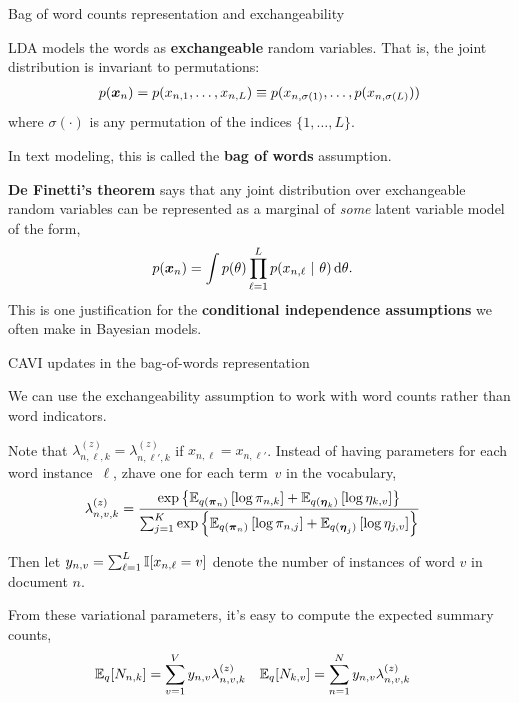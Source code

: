 \documentclass[aspectratio=169]{beamer}
\begin{document}
\begin{frame}{Bag of word counts representation and exchangeability}

LDA models the words as \textbf{exchangeable} random variables. That is, the joint distribution is invariant to permutations:
\begin{align}
    p(\boldsymbol{x}_n) = p(x_{n,1}, \ldots, x_{n,L}) \equiv
    p(x_{n,\sigma(1)}, \ldots, p(x_{n,\sigma(L)})) 
\end{align}
where $\sigma(\cdot)$ is any permutation of the indices $\{1,\ldots,L\}$.

In text modeling, this is called the \textbf{bag of words} assumption.

\textbf{De Finetti's theorem} says that any joint distribution over exchangeable random variables can be represented as a marginal of \textit{some} latent variable model of the form,
\begin{align}
    p(\boldsymbol{x}_n) &= \int p(\theta) \prod_{\ell=1}^L p(x_{n,\ell} ~\vert~ \theta) \mathop{}\!\mathrm{d} \theta.
\end{align}
This is one justification for the \textbf{conditional independence assumptions} we often make in Bayesian models.


\end{frame}

\begin{frame}{CAVI updates in the bag-of-words representation}

We can use the exchangeability assumption to work with word counts rather than word indicators. 

Note that $\lambda_{n,\ell,k}^{(z)} = \lambda_{n,\ell',k}^{(z)}$ if $x_{n,\ell} = x_{n,\ell'}$. Instead of having parameters for each word instance~$\ell$, zhave one for each term~$v$ in the vocabulary,
\begin{align}
\lambda_{n,v,k}^{(z)} &= \frac{\exp\left\{\mathbb{E}_{q(\boldsymbol{\pi}_n)} \left[ \log \pi_{n, k} \right] + \mathbb{E}_{q(\boldsymbol{\eta}_k)} \left[ \log \eta_{k, v} \right]\right\}}{\sum_{j=1}^K \exp\left\{\mathbb{E}_{q(\boldsymbol{\pi}_n)} \left[ \log \pi_{n, j} \right] + \mathbb{E}_{q(\boldsymbol{\eta}_j)} \left[ \log \eta_{j, v} \right]\right\} }
\end{align}

Then let $y_{n,v} = \sum_{\ell=1}^L \mathbb{I}[x_{n,\ell}=v]$ denote the number of instances of word $v$ in document $n$.

From these variational parameters, it's easy to compute the expected summary counts,
\begin{align}
    \mathbb{E}_{q}[N_{n,k}] &= \sum_{v=1}^V y_{n,v} \lambda^{(z)}_{n,v,k} 
    &
    \mathbb{E}_{q}[N_{k,v}] &= \sum_{n=1}^N y_{n,v} \lambda^{(z)}_{n,v,k} 
\end{align}
\end{frame}
\end{document}
